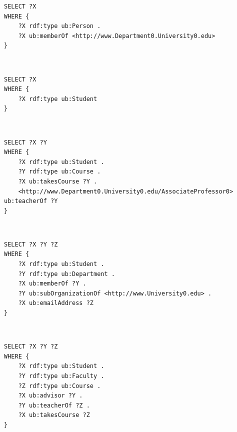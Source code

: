 \documentclass[10pt, a4paper]{report}
\begin{document}
\begin{enumerate}
\begin{minipage}{0.92\textwidth}
\begin{lstlisting}
SELECT ?X
WHERE {
    ?X rdf:type ub:Person .
    ?X ub:memberOf <http://www.Department0.University0.edu>
}
                        \end{lstlisting}
	\end{minipage} \\
	\begin{minipage}{0.92\textwidth}
		\item \label{query:lumb_sparql_6}
		\lstset{language=sql}
		\begin{lstlisting}
SELECT ?X
WHERE {
    ?X rdf:type ub:Student
}
                        \end{lstlisting}
	\end{minipage} \\
	\begin{minipage}{0.92\textwidth}
		\item \label{query:lumb_sparql_7}
		\lstset{language=sql}
		\begin{lstlisting}
SELECT ?X ?Y
WHERE {
    ?X rdf:type ub:Student .
    ?Y rdf:type ub:Course .
    ?X ub:takesCourse ?Y .
    <http://www.Department0.University0.edu/AssociateProfessor0> ub:teacherOf ?Y
}
                        \end{lstlisting}
	\end{minipage} \\
	\begin{minipage}{0.92\textwidth}
		\item \label{query:lumb_sparql_8}
		\lstset{language=sql}
		\begin{lstlisting}
SELECT ?X ?Y ?Z
WHERE {
    ?X rdf:type ub:Student .
    ?Y rdf:type ub:Department .
    ?X ub:memberOf ?Y .
    ?Y ub:subOrganizationOf <http://www.University0.edu> .
    ?X ub:emailAddress ?Z
}
                        \end{lstlisting}
	\end{minipage} \\
	\begin{minipage}{0.92\textwidth}
		\item \label{query:lumb_sparql_9}
		\lstset{language=sql}
		\begin{lstlisting}
SELECT ?X ?Y ?Z
WHERE {
    ?X rdf:type ub:Student .
    ?Y rdf:type ub:Faculty .
    ?Z rdf:type ub:Course .
    ?X ub:advisor ?Y .
    ?Y ub:teacherOf ?Z .
    ?X ub:takesCourse ?Z
}
                        \end{lstlisting}
	\end{minipage} \\
	\begin{minipage}{0.92\textwidth}

\end{minipage}
\end{enumerate}
\end{document}
